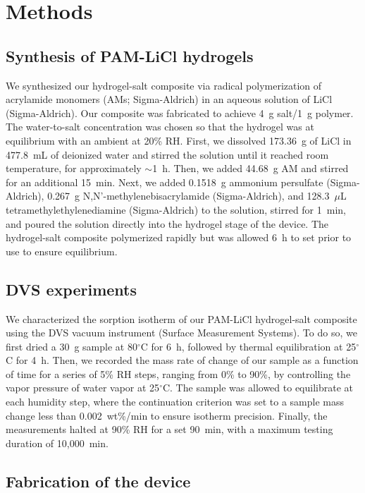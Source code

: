 \documentclass[11pt]{article}
\begin{document}
\section{Methods}

\subsection{Synthesis of PAM-LiCl hydrogels}

We synthesized our hydrogel-salt composite via radical polymerization of acrylamide monomers (AMs; Sigma-Aldrich) in an aqueous solution of LiCl (Sigma-Aldrich). Our composite was fabricated to achieve 4~g salt/1~g polymer. The water-to-salt concentration was chosen so that the hydrogel was at equilibrium with an ambient at 20\% RH. First, we dissolved 173.36~g of LiCl in 477.8~mL of deionized water and stirred the solution until it reached room temperature, for approximately $\sim$1~h. Then, we added 44.68~g AM and stirred for an additional 15~min. Next, we added 0.1518~g ammonium persulfate (Sigma-Aldrich), 0.267~g N,N'-methylenebisacrylamide (Sigma-Aldrich), and 128.3~$\mu$L tetramethylethylenediamine (Sigma-Aldrich) to the solution, stirred for 1~min, and poured the solution directly into the hydrogel stage of the device. The hydrogel-salt composite polymerized rapidly but was allowed 6~h to set prior to use to ensure equilibrium.

\subsection{DVS experiments}

We characterized the sorption isotherm of our PAM-LiCl hydrogel-salt composite using the DVS vacuum instrument (Surface Measurement Systems). To do so, we first dried a 30~g sample at 80$^\circ$C for 6~h, followed by thermal equilibration at 25$^\circ$C for 4~h. Then, we recorded the mass rate of change of our sample as a function of time for a series of 5\% RH steps, ranging from 0\% to 90\%, by controlling the vapor pressure of water vapor at 25$^\circ$C. The sample was allowed to equilibrate at each humidity step, where the continuation criterion was set to a sample mass change less than 0.002~wt\%/min to ensure isotherm precision. Finally, the measurements halted at 90\% RH for a set 90~min, with a maximum testing duration of 10,000~min.

\subsection{Fabrication of the device}
\end{document}
